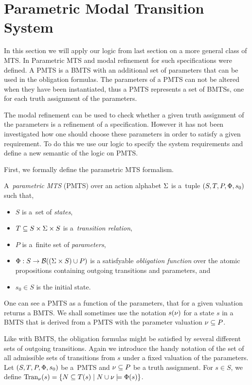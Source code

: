 \section{Parametric Modal Transition System}
In this section we will apply our logic from last section on a more general class of MTS. In \cite{BKLMS:ATVA:11} Parametric MTS and modal refinement for such specifications were defined. A PMTS is a BMTS with an additional set of parameters that can be used in the obligation formulas. The parameters of a PMTS can not be altered when they have been instantiated, thus a PMTS represents a set of BMTSs, one for each truth assignment of the parameters. 

The modal refinement can be used to check whether a given truth assignment of the parameters is a refinement of a specification. However it has not been investigated how one should choose these parameters in order to satisfy a given requirement. To do this we use our logic to specify the system requirements and define a new semantic of the logic on PMTS. 

First, we formally define the parametric MTS formalism.

\begin{definition}
A~\emph{parametric MTS} (PMTS) over an action alphabet $\mathrm{\Sigma}$ is 
a~tuple $(S,T,P,\mathrm{\Phi},s_0)$ such that,
\begin{itemize}
 	\item $S$ is a~set of \emph{states},
 	\item $T \subseteq S \times \mathrm{\Sigma} \times S$ is a~\emph{transition relation}, 
 	\item $P$ is a~finite set of \emph{parameters}, 
 	\item $\mathrm{\Phi} : S \to \mathcal B((\mathrm{\Sigma} \times S) \cup P)$ is a satisfyable \emph{obligation function} over the atomic propositions containing outgoing transitions and parameters, and
 	\item $s_0 \in S$ is the initial state. 
 \end{itemize} 
\end{definition}

One can see a PMTS as a function of the parameters, that for a given valuation returns a BMTS. 
We shall sometimes use the notation $s(\nu)$ for a state $s$ in a BMTS that is derived from a PMTS with the parameter valuation $\nu \subseteq P$.

Like with BMTS, the obligation formulas might be satisfied by several different sets of outgoing transitions. Again we introduce the handy notation of the set of all admissible sets of transitions from $s$ under a fixed valuation of the parameters. Let $(S,T,P,\mathrm{\Phi},s_0)$ be a~PMTS and $\nu \subseteq P$ be 
a truth assignment. For $s \in S$, we define 
 $\mathrm{Tran}_{\nu}(s) = \{ N \subseteq T(s) \mid N \cup \nu 
\models \mathrm{\Phi}(s)\}$. 

